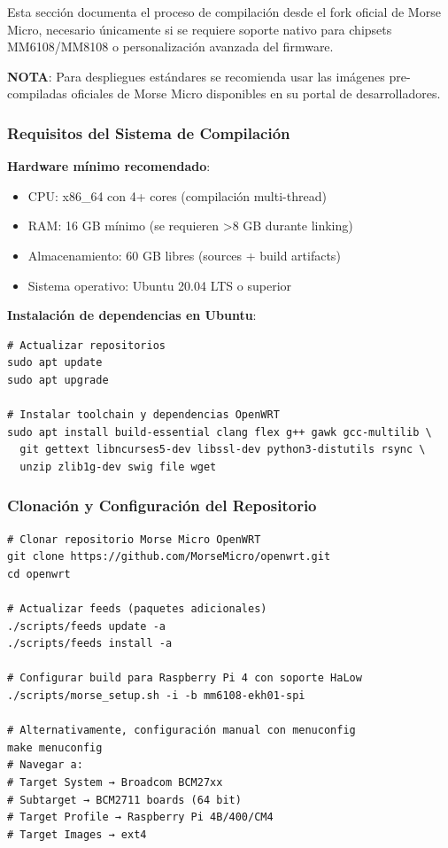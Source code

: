 Esta sección documenta el proceso de compilación desde el fork oficial de Morse Micro, necesario únicamente si se requiere soporte nativo para chipsets MM6108/MM8108 o personalización avanzada del firmware.

\textbf{NOTA}: Para despliegues estándares se recomienda usar las imágenes pre-compiladas oficiales de Morse Micro disponibles en su portal de desarrolladores.

\subsubsection{Requisitos del Sistema de Compilación}

\textbf{Hardware mínimo recomendado}:
\begin{itemize}
    \item CPU: x86\_64 con 4+ cores (compilación multi-thread)
    \item RAM: 16 GB mínimo (se requieren >8 GB durante linking)
    \item Almacenamiento: 60 GB libres (sources + build artifacts)
    \item Sistema operativo: Ubuntu 20.04 LTS o superior
\end{itemize}

\textbf{Instalación de dependencias en Ubuntu}:
\begin{verbatim}
# Actualizar repositorios
sudo apt update
sudo apt upgrade

# Instalar toolchain y dependencias OpenWRT
sudo apt install build-essential clang flex g++ gawk gcc-multilib \
  git gettext libncurses5-dev libssl-dev python3-distutils rsync \
  unzip zlib1g-dev swig file wget
\end{verbatim}

\subsubsection{Clonación y Configuración del Repositorio}

\begin{verbatim}
# Clonar repositorio Morse Micro OpenWRT
git clone https://github.com/MorseMicro/openwrt.git
cd openwrt

# Actualizar feeds (paquetes adicionales)
./scripts/feeds update -a
./scripts/feeds install -a

# Configurar build para Raspberry Pi 4 con soporte HaLow
./scripts/morse_setup.sh -i -b mm6108-ekh01-spi

# Alternativamente, configuración manual con menuconfig
make menuconfig
# Navegar a:
# Target System → Broadcom BCM27xx
# Subtarget → BCM2711 boards (64 bit)
# Target Profile → Raspberry Pi 4B/400/CM4
# Target Images → ext4
\end{verbatim}

